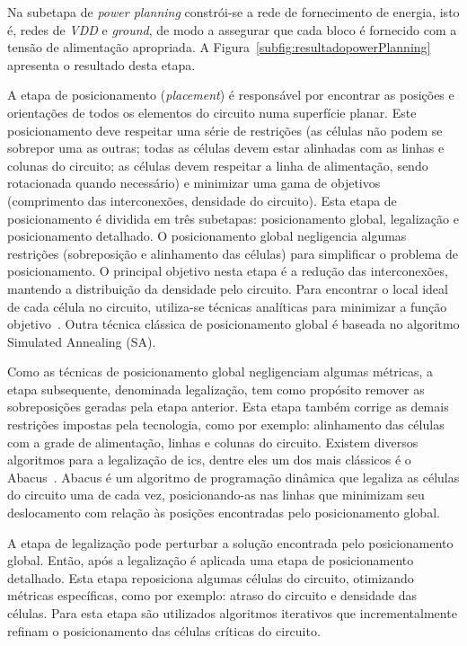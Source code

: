 Na subetapa de \textit{power planning} constrói-se a rede de fornecimento de energia, isto é, redes de \textit{VDD} e \textit{ground}, de modo a assegurar que cada bloco é fornecido com a tensão de alimentação apropriada. A Figura~\ref{subfig:resultadopowerPlanning} apresenta o resultado desta etapa.

A etapa de posicionamento (\textit{placement}) é responsável por encontrar as posições e orientações de todos os elementos do circuito numa superfície planar.
Este posicionamento deve respeitar uma série de restrições (as células não podem se sobrepor uma as outras; todas as células devem estar alinhadas com as linhas e colunas do circuito; as células devem respeitar a linha de alimentação, sendo rotacionada quando necessário) e minimizar uma gama de objetivos (comprimento das interconexões, densidade do circuito).
Esta etapa de posicionamento é dividida em três subetapas: posicionamento global, legalização e posicionamento detalhado.
O posicionamento global negligencia algumas restrições (sobreposição e alinhamento das células) para simplificar o problema de posicionamento.
O principal objetivo nesta etapa é a redução das interconexões, mantendo a distribuição da densidade pelo circuito.
Para encontrar o local ideal de cada célula no circuito, utiliza-se técnicas analíticas para minimizar a função objetivo~\cite{tsay1988proud, eisenmann1998generic, Lin2013Polar}.
Outra técnica clássica de posicionamento global é baseada no algoritmo Simulated Annealing (SA). 

Como as técnicas de posicionamento global negligenciam algumas métricas, a etapa subsequente, denominada legalização, tem como propósito remover as sobreposições geradas pela etapa anterior.
Esta etapa também corrige as demais restrições impostas pela tecnologia, como por exemplo: alinhamento das células com a grade de alimentação, linhas e colunas do circuito.
Existem diversos algoritmos para a legalização de \acp{ic}, dentre eles um dos mais clássicos é o Abacus~\cite{spindler2008abacus}.
Abacus é um algoritmo de programação dinâmica que legaliza as células do circuito uma de cada vez, posicionando-as nas linhas que minimizam seu deslocamento com relação às posições encontradas pelo posicionamento global.

A etapa de legalização pode perturbar a solução encontrada pelo posicionamento global. Então, após a legalização é aplicada uma etapa de posicionamento detalhado.
Esta etapa reposiciona algumas células do circuito, otimizando métricas específicas, como por exemplo: atraso do circuito e densidade das células.
Para esta etapa são utilizados algoritmos iterativos que incrementalmente refinam o posicionamento das células críticas do circuito.

